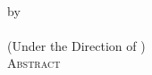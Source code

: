 
\newpage
{}
\thispagestyle{empty}
\vspace*{18pt}
\begin{center}
\textsc{\thesistitle}\\[18pt]
by\\[18pt]
\textsc{\yourname}\\[12pt]
(Under the Direction of \majorprof)\\[12pt]
\textsc{Abstract}
\end{center}
